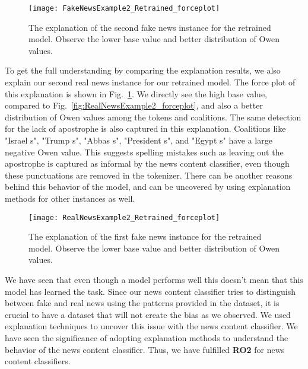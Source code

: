 \begin{figure}
    \centering
    \texttt{[image: FakeNewsExample2\_Retrained\_forceplot]}
    \caption[The explanation of the second fake news instance for the retrained model.]{The explanation of the second fake news instance for the retrained model. Observe the lower base value and better distribution of Owen values.}
    \label{fig:FakeNewsExample2_Retrained_forceplot}
\end{figure}
To get the full understanding by comparing the explanation results, we also explain our second real news instance for our retrained model. The force plot of this explanation is shown in Fig.~\ref{fig:FakeNewsExample2_Retrained_forceplot}. We directly see the high base value, compared to Fig.~\ref{fig:RealNewsExample2_forceplot}, and also a better distribution of Owen values among the tokens and coalitions. The same detection for the lack of apostrophe is also captured in this explanation. Coalitions like "Israel s", "Trump s", "Abbas s", "President s", and "Egypt s" have a large negative Owen value. This suggests spelling mistakes such as leaving out the apostrophe is captured as informal by the news content classifier, even though these punctuations are removed in the tokenizer. There can be another reasons behind this behavior of the model, and can be uncovered by using explanation methods for other instances as well.
\begin{figure}
    \centering
    \texttt{[image: RealNewsExample2\_Retrained\_forceplot]}
    \caption[The explanation of the first fake news instance for the retrained model.]{The explanation of the first fake news instance for the retrained model. Observe the lower base value and better distribution of Owen values.}
    \label{fig:RealNewsExample2_Retrained_forceplot}
\end{figure}
We have seen that even though a model performs well this doesn't mean that this model has learned the task. Since our news content classifier tries to distinguish between fake and real news using the patterns provided in the dataset, it is crucial to have a dataset that will not create the bias as we observed. We used explanation techniques to uncover this issue with the news content classifier. We have seen the significance of adopting explanation methods to understand the behavior of the news content classifier. Thus, we have fulfilled \textbf{RO2} for news content classifiers.\\
